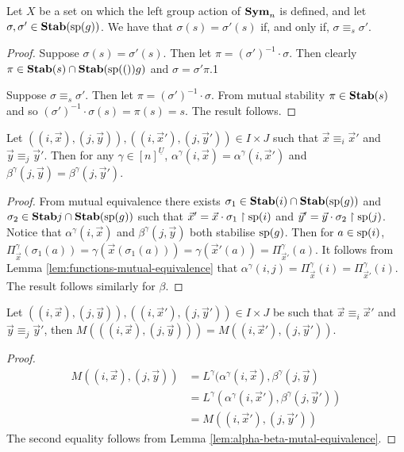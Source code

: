 \documentclass[../paper.tex]{subfiles}
\begin{document}
\begin{lem}
  Let $X$ be a set on which the left group action of $\text{\textbf{Sym}}_n$ is defined, and
  let $\sigma, \sigma' \in \text{\textbf{Stab}}(\text{sp}(g))$. We have that $\sigma(s) = \sigma'
  (s)$ if, and only if, $\sigma \equiv_s \sigma'$.
  \label{lem:functions-mutual-equivalence}
\end{lem}
\begin{proof}
  Suppose $\sigma(s) = \sigma'(s)$. Then let $\pi = (\sigma')^{-1} \cdot
  \sigma$. Then clearly $\pi \in \text{\textbf{Stab}}(s) \cap \text{\textbf{Stab}} (\text{sp} (())g)$ and $\sigma = \sigma'
  \pi$.1

  Suppose $\sigma \equiv_s \sigma'$. Then let $\pi = (\sigma')^{-1} \cdot
  \sigma$. From mutual stability $\pi \in \text{\textbf{Stab}} (s)$ and so $(\sigma')^{-1}\cdot
  \sigma (s) = \pi (s) = s$. The result follows.
\end{proof}

\begin{lem}
  Let $((i, \vec{x}), (j, \vec{y})), ((i, \vec{x}'), (j, \vec{y}')) \in I \times
  J$ such that $\vec{x} \equiv_i \vec{x}'$ and $\vec{y} \equiv_j \vec{y}'$. Then
  for any $\gamma \in [n]^{\underline{U}}$, $\alpha^{\gamma}(i, \vec{x}) =
  \alpha^{\gamma}(i, \vec{x}')$ and $\beta^{\gamma}(j, \vec{y}) =
  \beta^{\gamma}(j, \vec{y}')$.
  \label{lem:alpha-beta-mutal-equivalence}
\end{lem}
\begin{proof}
  From mutual equivalence there exists $\sigma_1 \in \text{\textbf{Stab}}(i) \cap \text{\textbf{Stab}} (\text{sp} (g))$
  and $\sigma_2 \in \text{\textbf{Stab}}{j} \cap \text{\textbf{Stab}} (\text{sp} (g))$ such that $\vec{x}' = \vec{x}
  \cdot \sigma_1\restriction{\text{sp}(i)}$ and $\vec{y}' = \vec{y} \cdot
  \sigma_2\restriction{\text{sp}(j)}$. Notice that $\alpha^{\gamma}(i, \vec{x})$
  and $\beta^{\gamma}(j, \vec{y})$ both stabilise $\text{sp}(g)$. Then for $a \in
  \text{sp}(i)$, $\Pi^{\gamma}_{\vec{x}} (\sigma_1 (a)) = \gamma (\vec{x}(\sigma_1
  (a))) = \gamma (\vec{x}'(a)) = \Pi^{\gamma}_{\vec{x}'}(a)$. It follows from
  Lemma \ref{lem:functions-mutual-equivalence} that $\alpha^{\gamma}(i,j) =
  \Pi^{\gamma}_{\vec{x}} (i) = \Pi^{\gamma}_{\vec{x}'}(i)$. The result follows
  similarly for $\beta$.
\end{proof}

\begin{lem}
  Let $((i, \vec{x}), (j, \vec{y})), ((i, \vec{x}'), (j, \vec{y}')) \in I \times
  J$ be such that $\vec{x} \equiv_i \vec{x}'$ and $\vec{y} \equiv_j \vec{y}'$,
  then $M(((i, \vec{x}), (j, \vec{y}))) = M((i, \vec{x}'), (j, \vec{y}'))$.
  \label{lem:matrix-quot-well-defined}
\end{lem}
\begin{proof}
  \begin{align*}
    M((i, \vec{x}),(j, \vec{y})) &= L^{\gamma}(\alpha^{\gamma}(i, \vec{x}), \beta^{\gamma}(j, \vec{y}) \\
                                 &= L^{\gamma}(\alpha^{\gamma}(i, \vec{x}'), \beta^{\gamma}(j, \vec{y}'))\\
                                 &= M((i, \vec{x}'), (j, \vec{y}'))
  \end{align*}
  The second equality follows from Lemma \ref{lem:alpha-beta-mutal-equivalence}.
\end{proof}
\end{document}
